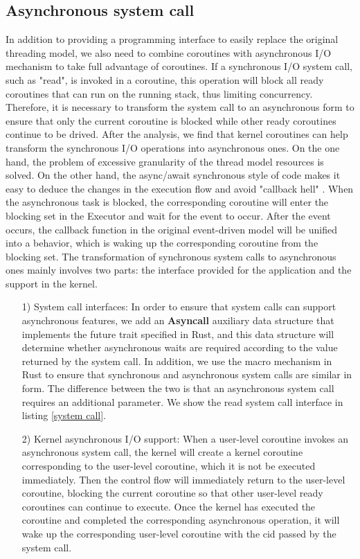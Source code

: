 \documentclass[sigconf,review,anonymous]{acmart}
\begin{document}
\subsection{Asynchronous system call}

In addition to providing a programming interface to easily replace the original threading model, we also need to combine coroutines with asynchronous I/O mechanism to take full advantage of coroutines. If a synchronous I/O system call, such as "read", is invoked in a coroutine, this operation will block all ready coroutines that can run on the running stack, thus limiting concurrency. Therefore, it is necessary to transform the system call to an asynchronous form to ensure that only the current coroutine is blocked while other ready coroutines continue to be drived. After the analysis, we find that kernel coroutines can help transform the synchronous I/O operations into asynchronous ones. On the one hand, the problem of excessive granularity of the thread model resources is solved. On the other hand, the async/await synchronous style of code makes it easy to deduce the changes in the execution flow and avoid "callback hell" \cite{callbackhell}. When the asynchronous task is blocked, the corresponding coroutine will enter the blocking set in the Executor and wait for the event to occur. After the event occurs, the callback function in the original event-driven model will be unified into a behavior, which is waking up the corresponding coroutine from the blocking set. The transformation of synchronous system calls to asynchronous ones mainly involves two parts: the interface provided for the application and the support in the kernel.

\begin{itemize}[leftmargin=*]
    \item[1)] System call interfaces: In order to ensure that system calls can support asynchronous features, we add an \textbf{Asyncall} auxiliary data structure that implements the future trait specified in Rust, and this data structure will determine whether asynchronous waits are required according to the value returned by the system call. In addition, we use the macro mechanism in Rust to ensure that synchronous and asynchronous system calls are similar in form. The difference between the two is that an asynchronous system call requires an additional parameter. We show the read system call interface in listing \ref{system call}.
    \item[2)] Kernel asynchronous I/O support: When a user-level coroutine invokes an asynchronous system call, the kernel will create a kernel coroutine corresponding to the user-level coroutine, which it is not be executed immediately. Then the control flow will immediately return to the user-level coroutine, blocking the current coroutine so that other user-level ready coroutines can continue to execute. Once the kernel has executed the coroutine and completed the corresponding asynchronous operation, it will wake up the corresponding user-level coroutine with the cid passed by the system call. 
\end{itemize}
\end{document}
